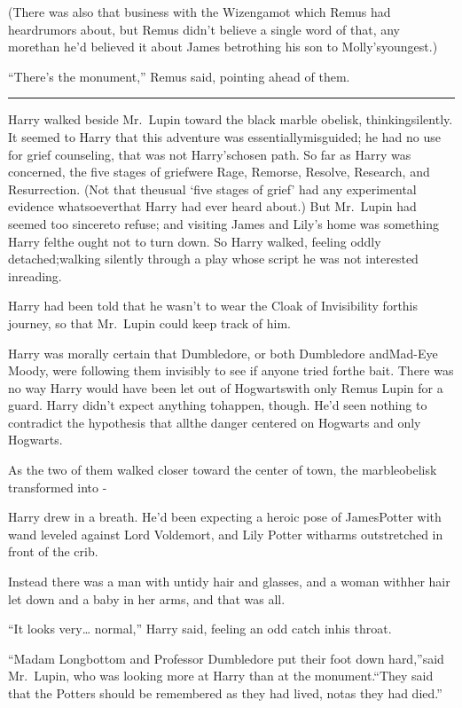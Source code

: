 (There was also that business with the Wizengamot which Remus had heardrumors about, but Remus didn't believe a single word of that, any morethan he'd believed it about James betrothing his son to Molly'syoungest.)

``There's the monument,'' Remus said, pointing ahead of them.

\begin{center}\rule{3in}{0.4pt}\end{center}

Harry walked beside Mr.~Lupin toward the black marble obelisk, thinkingsilently. It seemed to Harry that this adventure was essentiallymisguided; he had no use for grief counseling, that was not Harry'schosen path. So far as Harry was concerned, the five stages of griefwere Rage, Remorse, Resolve, Research, and Resurrection. (Not that theusual `five stages of grief' had any experimental evidence whatsoeverthat Harry had ever heard about.) But Mr.~Lupin had seemed too sincereto refuse; and visiting James and Lily's home was something Harry felthe ought not to turn down. So Harry walked, feeling oddly detached;walking silently through a play whose script he was not interested inreading.

Harry had been told that he wasn't to wear the Cloak of Invisibility forthis journey, so that Mr.~Lupin could keep track of him.

Harry was morally certain that Dumbledore, or both Dumbledore andMad-Eye Moody, were following them invisibly to see if anyone tried forthe bait. There was no way Harry would have been let out of Hogwartswith only Remus Lupin for a guard. Harry didn't expect anything tohappen, though. He'd seen nothing to contradict the hypothesis that allthe danger centered on Hogwarts and only Hogwarts.

As the two of them walked closer toward the center of town, the marbleobelisk transformed into -

Harry drew in a breath. He'd been expecting a heroic pose of JamesPotter with wand leveled against Lord Voldemort, and Lily Potter witharms outstretched in front of the crib.

Instead there was a man with untidy hair and glasses, and a woman withher hair let down and a baby in her arms, and that was all.

``It looks very\ldots{} normal,'' Harry said, feeling an odd catch inhis throat.

``Madam Longbottom and Professor Dumbledore put their foot down hard,''said Mr.~Lupin, who was looking more at Harry than at the monument.``They said that the Potters should be remembered as they had lived, notas they had died.''

